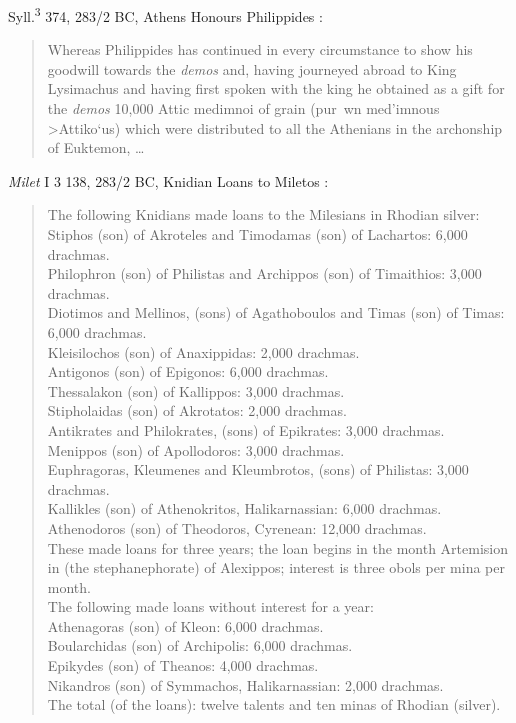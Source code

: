 \documentclass{article}
\newcommand{\Gk}[1]{\selectlanguage{polutonikogreek}#1\selectlanguage{english}}
\begin{document}
Syll.\textsuperscript{3} 374, 283/2 BC, Athens Honours Philippides \cite[p.~28]{hellenistic2004}:

\begin{quote}
Whereas Philippides has continued in every circumstance to
show his goodwill towards the {\em demos} and, having journeyed abroad to King
Lysimachus and having first spoken with the king he obtained as a gift for
the {\em demos} 10,000 Attic medimnoi of grain (\Gk{pur~wn med'imnous >Attiko`us}) which were distributed to all the
Athenians in the archonship of Euktemon, \dots
\end{quote}

{\em Milet} I 3 138, 283/2 BC, Knidian Loans to Miletos \cite[p.~31]{hellenistic2004}:

\begin{quote}
The following Knidians made loans to the Milesians in Rhodian silver:\\
Stiphos (son) of Akroteles and Timodamas (son) of Lachartos: 6,000
drachmas.\\
Philophron (son) of Philistas and Archippos (son) of Timaithios: 3,000
drachmas.\\
Diotimos and Mellinos, (sons) of Agathoboulos and Timas (son) of Timas:
6,000 drachmas.\\
Kleisilochos (son) of Anaxippidas: 2,000 drachmas.\\
Antigonos (son) of Epigonos: 6,000 drachmas.\\
Thessalakon (son) of Kallippos: 3,000 drachmas.\\
Stipholaidas (son) of Akrotatos: 2,000 drachmas.\\
Antikrates and Philokrates, (sons) of Epikrates: 3,000 drachmas.\\
Menippos (son) of Apollodoros: 3,000 drachmas.\\
Euphragoras, Kleumenes and Kleumbrotos, (sons) of Philistas: 3,000
drachmas.\\
Kallikles (son) of Athenokritos, Halikarnassian: 6,000 drachmas.\\
Athenodoros (son) of Theodoros, Cyrenean: 12,000 drachmas.\\
These made loans for three years; the loan begins in the month Artemision
in (the stephanephorate) of Alexippos; interest is three obols per mina per
month.\\
The following made loans without interest for a year:\\
Athenagoras (son) of Kleon: 6,000 drachmas.\\
Boularchidas (son) of Archipolis: 6,000 drachmas.\\
Epikydes (son) of Theanos: 4,000 drachmas.\\
Nikandros (son) of Symmachos, Halikarnassian: 2,000 drachmas.\\
The total (of the loans): twelve talents and ten minas of Rhodian (silver).
\end{quote}
\end{document}
